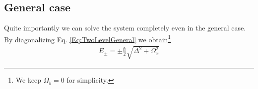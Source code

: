 \subsection{General case}

Quite importantly we can solve the system completely even in the general case. By diagonalizing  Eq. \eqref{Eq:TwoLevelGeneral} we obtain\footnote{We keep $\Omega_y =0$ for simplicity.}
\begin{align}\label{eq:Epm}
 E_\pm = \pm \frac{\hbar}{2} \sqrt{\Delta^2+\Omega_x^2}
\end{align}